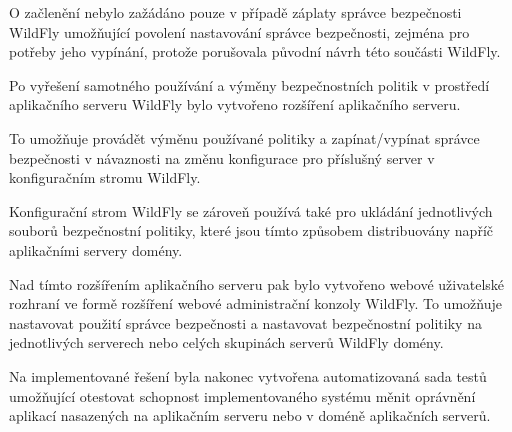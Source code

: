 O začlenění nebylo zažádáno pouze v případě záplaty správce bezpečnosti WildFly umožňující povolení nastavování správce bezpečnosti,
zejména pro potřeby jeho vypínání, protože porušovala původní návrh této součásti WildFly.

Po vyřešení samotného používání a výměny bezpečnostních politik v prostředí aplikačního serveru WildFly bylo vytvořeno rozšíření aplikačního serveru.

To umožňuje provádět výměnu používané politiky a zapínat/vypínat správce bezpečnosti v návaznosti na změnu konfigurace pro příslušný server
v konfiguračním stromu WildFly.

Konfigurační strom WildFly se zároveň používá také pro ukládání jednotlivých souborů bezpečnostní politiky, které jsou tímto způsobem distribuovány napříč aplikačními servery domény.

Nad tímto rozšířením aplikačního serveru pak bylo vytvořeno webové uživatelské rozhraní ve formě rozšíření webové administrační konzoly WildFly.
To umožňuje nastavovat použití správce bezpečnosti a nastavovat bezpečnostní politiky na jednotlivých serverech nebo celých skupinách serverů WildFly domény.

Na implementované řešení byla nakonec vytvořena automatizovaná sada testů umožňující otestovat schopnost implementovaného systému měnit oprávnění
aplikací nasazených na aplikačním serveru nebo v doméně aplikačních serverů.

